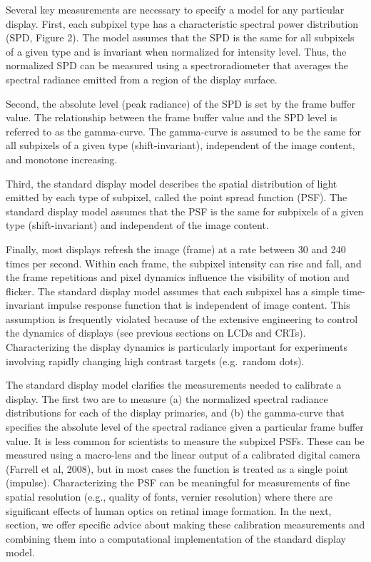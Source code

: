 \documentclass[
  letterpaper,
]{book}
\begin{document}
Several key measurements are necessary to specify a model for any
particular display. First, each subpixel type has a characteristic
spectral power distribution (SPD, Figure 2). The model assumes that the
SPD is the same for all subpixels of a given type and is invariant when
normalized for intensity level. Thus, the normalized SPD can be measured
using a spectroradiometer that averages the spectral radiance emitted
from a region of the display surface.

Second, the absolute level (peak radiance) of the SPD is set by the
frame buffer value. The relationship between the frame buffer value and
the SPD level is referred to as the gamma-curve. The gamma-curve is
assumed to be the same for all subpixels of a given type
(shift-invariant), independent of the image content, and monotone
increasing.

Third, the standard display model describes the spatial distribution of
light emitted by each type of subpixel, called the point spread function
(PSF). The standard display model assumes that the PSF is the same for
subpixels of a given type (shift-invariant) and independent of the image
content.

Finally, most displays refresh the image (frame) at a rate between 30
and 240 times per second. Within each frame, the subpixel intensity can
rise and fall, and the frame repetitions and pixel dynamics influence
the visibility of motion and flicker. The standard display model assumes
that each subpixel has a simple time-invariant impulse response function
that is independent of image content. This assumption is frequently
violated because of the extensive engineering to control the dynamics of
displays (see previous sections on LCDs and CRTs). Characterizing the
display dynamics is particularly important for experiments involving
rapidly changing high contrast targets (e.g.~random dots).

The standard display model clarifies the measurements needed to
calibrate a display. The first two are to measure (a) the normalized
spectral radiance distributions for each of the display primaries, and
(b) the gamma-curve that specifies the absolute level of the spectral
radiance given a particular frame buffer value. It is less common for
scientists to measure the subpixel PSFs. These can be measured using a
macro-lens and the linear output of a calibrated digital camera (Farrell
et al, 2008), but in most cases the function is treated as a single
point (impulse). Characterizing the PSF can be meaningful for
measurements of fine spatial resolution (e.g., quality of fonts, vernier
resolution) where there are significant effects of human optics on
retinal image formation. In the next, section, we offer specific advice
about making these calibration measurements and combining them into a
computational implementation of the standard display model.
\end{document}
